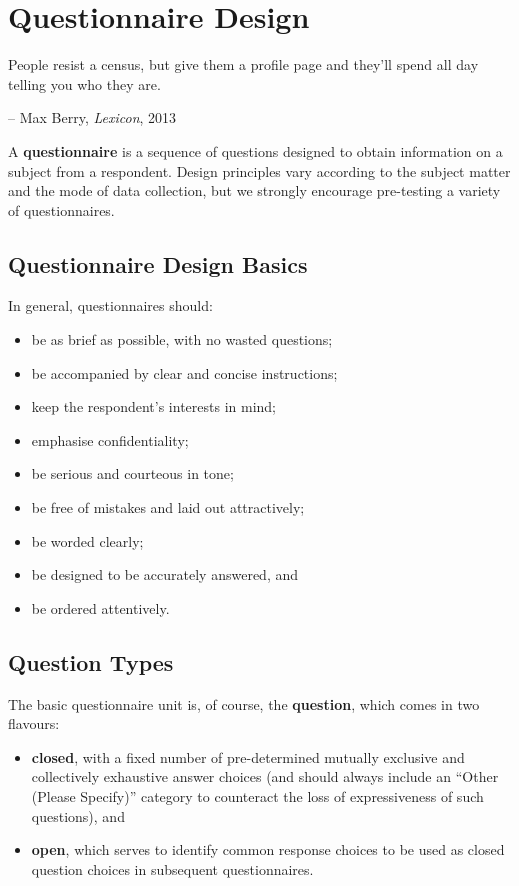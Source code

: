 \section{Questionnaire Design}
\begin{tcolorbox}[title=A Modern Paradox]
People resist a census, but give them a profile page and they'll spend all day telling you who they are. \\[-0.6cm]
\begin{flushright}
-- Max Berry, \textit{Lexicon}, 2013
\end{flushright}
\end{tcolorbox}
\noindent 
A \textbf{questionnaire} is a sequence of questions designed to obtain information on a subject from a respondent. Design principles vary according to the subject matter and the mode of data collection, but we strongly encourage pre-testing a variety of questionnaires.\subsection{Questionnaire Design Basics} In general, questionnaires should: 
\begin{itemize}[noitemsep] 
\item be as brief as possible, with no wasted questions;
\item be accompanied by clear and concise instructions;
\item keep the respondent's interests in mind;
\item emphasise confidentiality;
\item be serious and courteous in tone;
\item be free of mistakes and laid out attractively;
\item be worded clearly; 
\item be designed to be accurately answered, and 
\item be ordered attentively. 
\end{itemize}
\subsection{Question Types} The basic questionnaire unit is, of course, the \textbf{question}, which comes in two flavours: 
\begin{itemize}[noitemsep]
\item \textbf{closed}, with a fixed number of pre-determined mutually exclusive and collectively exhaustive answer choices (and should always include an ``Other (Please Specify)'' category to counteract the loss of expressiveness of such questions), and
\item \textbf{open}, which serves to identify common response choices to be used as closed question choices in subsequent questionnaires. 
\end{itemize}
